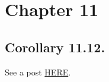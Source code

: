 \section{Chapter 11}

\subsection{Corollary 11.12.}

See a post \href{https://math.stackexchange.com/questions/3498733/every-prime-ideal-has-finite-height-in-a-noetherian-ring}{HERE}.